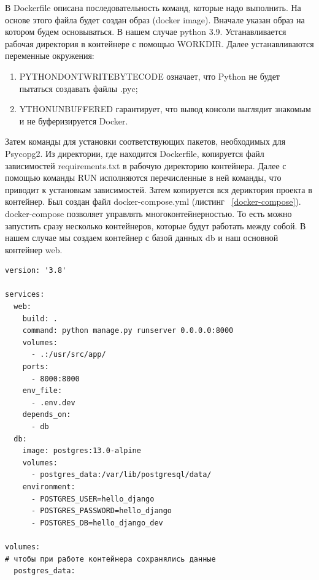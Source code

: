 	В \textsf{Dockerfile} описана последовательность команд, которые надо выполнить. На основе этого файла будет создан образ (\textsf{docker image}). Вначале указан образ на котором будем основываться. В нашем случае python 3.9. Устанавливается рабочая директория в контейнере с помощью \textsf{WORKDIR}. Далее устанавливаются переменные окружения:

\begin{enumerate}
	\item \textsf{PYTHONDONTWRITEBYTECODE} означает, что \textsf{Python} не будет пытаться создавать файлы \textsf{.pyc};
	\item \textsf{YTHONUNBUFFERED} гарантирует, что вывод консоли выглядит знакомым и не буферизируется Docker.
\end{enumerate}
	Затем команды для установки соответствующих пакетов, необходимых для \textsf{Psycopg2}. Из директории, где находится \textsf{Dockerfile}, копируется файл зависимостей \textsf{requirements.txt} в рабочую директорию контейнера. Далее с помощью команды \textsf{RUN} исполняются перечисленные в ней команды, что приводит к установкам зависимостей. Затем копируется вся дериктория проекта в контейнер.
	Был создан файл \textsf{docker-compose.yml} (листинг ~\ref{docker-compose}). \textsf{docker-compose} позволяет управлять многоконтейнерностью. То есть можно запустить сразу несколько контейнеров, которые будут работать между собой. В нашем случае мы создаем контейнер с базой данных \textsf{db} и наш основной контейнер \textsf{web}.
\begin{lstlisting}[frame=single, label={docker-compose}, caption={\textsf{docker-compose.yml}}, language=docker-compose] 
version: '3.8'

services:
  web:
    build: .
    command: python manage.py runserver 0.0.0.0:8000
    volumes:
      - .:/usr/src/app/
    ports:
      - 8000:8000
    env_file:
      - .env.dev
    depends_on:
      - db
  db:
    image: postgres:13.0-alpine
    volumes:
      - postgres_data:/var/lib/postgresql/data/
    environment:
      - POSTGRES_USER=hello_django
      - POSTGRES_PASSWORD=hello_django
      - POSTGRES_DB=hello_django_dev

volumes:
# чтобы при работе контейнера сохранялись данные
  postgres_data:
\end{lstlisting}

